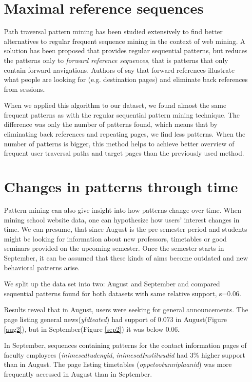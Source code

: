 \documentclass[12pt, english,a4paper]{article}
\begin{document}
\section{Maximal reference sequences}
Path traversal pattern mining has been studied extensively to find better alternatives to regular frequent sequence mining in the context of web mining. A solution has been proposed \cite{path_patterns} that provides regular sequential patterns, but reduces the patterns only to \emph{forward reference sequences}, that is patterns that only contain forward navigations. Authors of \cite{path_patterns} say that forward references illustrate what people are looking for (e.g. destination pages) and eliminate back references from sessions.

When we applied this algorithm to our dataset, we found almost the same frequent patterns as with the regular sequential pattern mining technique. The difference was only the number of patterns found, which means that by eliminating back references and repeating pages, we find less patterns. When the number of patterns is bigger, this method helps to achieve better overview of frequent user traversal paths and target pages than the previously used method.

\section{Changes in patterns through time} 
Pattern mining can also give insight into how patterns change over time. When mining school website data, one can hypothesize how users' interest changes in time. We can presume, that since August is the pre-semester period and students might be looking for information about new professors, timetables or good seminars provided on the upcoming semester. Once the semester starts in September, it can be assumed that these kinds of aims become outdated and new behavioral patterns arise.

We split up the data set into two: August and September and compared sequential patterns found for both datasets with same relative support, s=$0.06$.

Results reveal that in August, users were seeking for general announcements. The page listing general news(\emph{yldteated}) had support of $0.073$ in August(Figure \ref{aug2}), but in September(Figure \ref{sep2}) it was below $0.06$. 

In September, sequences containing patterns for the contact information pages of faculty employees (\emph{inimesedtudengid}, \emph{inimesedInstituudid} had 3\% higher support than in August. The page listing timetables (\emph{oppetootunniplaanid}) was more frequently accessed in August than in September.
\end{document}
